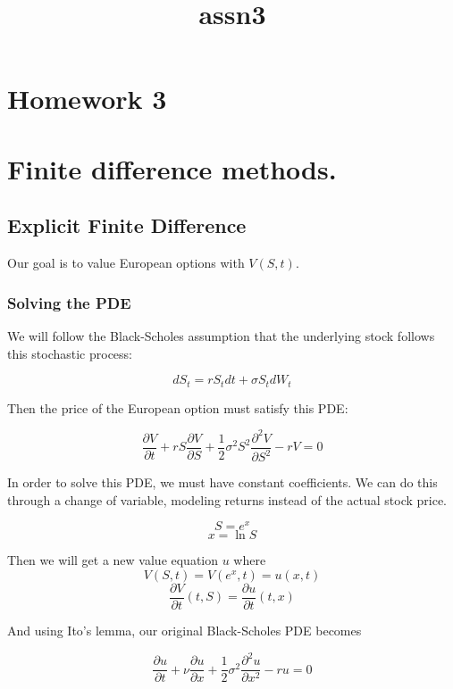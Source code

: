 \documentclass[11pt]{article}
\title{assn3}
\begin{document}
    
    \maketitle
    
    

    
    \section{Homework 3}\label{homework-3}

    \section{Finite difference methods.}\label{finite-difference-methods.}

    \subsection{Explicit Finite
Difference}\label{explicit-finite-difference}

    Our goal is to value European options with \(V(S, t)\).

    \subsubsection{Solving the PDE}\label{solving-the-pde}

    We will follow the Black-Scholes assumption that the underlying stock
follows this stochastic process:

\[dS_t = rS_t dt + \sigma S_t dW_t\]

Then the price of the European option must satisfy this PDE:

\[\frac{\partial V}{\partial t} + rS \frac{\partial V}{\partial S} + \frac{1}{2} \sigma^2 S^2 \frac{\partial^2 V}{\partial S^2} - rV = 0\]

    In order to solve this PDE, we must have constant coefficients. We can
do this through a change of variable, modeling returns instead of the
actual stock price.

\[S = e^x\] \[x = \ln S\]

Then we will get a new value equation \(u\) where
\[V(S, t) = V(e^x, t) = u(x, t)\]
\[\frac{\partial V}{\partial t}(t, S) = \frac{\partial u}{\partial t}(t, x)\]

And using Ito's lemma, our original Black-Scholes PDE becomes

\[\frac{\partial u}{\partial t} + \nu\frac{\partial u}{\partial x} + \frac{1}{2}\sigma^2 \frac{\partial^2 u}{\partial x^2} - ru = 0\]
\end{document}
